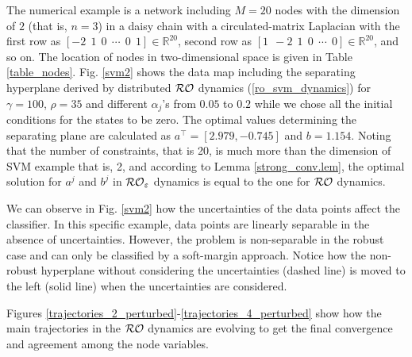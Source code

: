 \documentclass[journal,twoside,web]{ieeecolor}
\begin{document}
The numerical example is a network including $M=20$ nodes with the dimension of $2$ (that is, $n=3$) in a daisy chain with a circulated-matrix Laplacian with the first row as
$[-2 \ \ 1 \ \ 0 \ \ \cdots \ \ 0 \ \ 1] \in \mathbb{R}^{20}$, second row as $[1 \ \ -2 \ \ 1 \ \ 0 \ \ \cdots \ \ 0] \in \mathbb{R}^{20}$, and so on. The location of nodes in two-dimensional space is given in Table \ref{table_nodes}. Fig. \ref{svm2} shows the data map including the separating hyperplane derived by distributed ${\cal RO}$ dynamics (\ref{ro_svm_dynamics}) for $\gamma=100$, $\rho=35$ and different $\alpha_j$'s from $0.05$ to $0.2$ while we chose all the initial conditions for the states to be zero. The optimal values determining the separating plane are calculated as $a^\top=[2.979,-0.745]$ and $b=1.154$. %
Noting that the number of constraints, that is 20, is much more than the dimension of SVM example that is, 2, and according to Lemma \ref{strong_conv.lem}, the optimal solution for $a^j$ and $b^j$ in ${\cal RO}_\varepsilon$ dynamics is equal to the one for ${\cal RO}$ dynamics.

We can observe in Fig. \ref{svm2} how the uncertainties of the data points affect the classifier. In this specific example, data points are linearly separable in the absence of uncertainties. However, the problem is non-separable in the robust case and can only be classified by a soft-margin approach. Notice how the non-robust hyperplane without considering the uncertainties (dashed line) is moved to the left (solid line) when the uncertainties are considered. 


Figures \ref{trajectories_2_perturbed}-\ref{trajectories_4_perturbed} show how the main trajectories in the ${\cal RO}$ dynamics are evolving to get the final convergence and agreement among the node variables.
\end{document}
